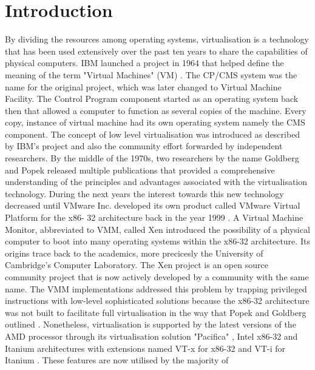 \section{Introduction}
By dividing the resources among operating systems,
virtualisation is a technology that has been used
extensively over the past ten years to share the
capabilities of physical computers. IBM launched a
project in 1964 that helped define the meaning of the term
"Virtual Machines" (VM) \cite{citation_1}. The CP/CMS system was
the name for the original project, which was later changed
to Virtual Machine Facility. The Control Program
component started as an operating system back then that
allowed a computer to function as several copies of the
machine. Every copy, instance of virtual machine had its
own operating system namely the CMS component. The
concept of low level virtualisation was introduced as
described by IBM’s project and also the community effort
forwarded by independent researchers. By the middle of
the 1970s, two researchers by the name Goldberg and
Popek released multiple publications \cite{citation_2}\cite{citation_3} that provided
a comprehensive understanding of the principles and
advantages associated with the virtualisation technology.
During the next years the interest towards this new
technology decreased until VMware Inc. developed its
own product called VMware Virtual Platform for the x86-
32 architecture back in the year 1999 \cite{citation_4}. \newline \newline
A Virtual Machine Monitor, abbreviated to VMM, called
Xen \cite{citation_5} introduced the possibility of a physical computer
to boot into many operating systems within the x86-32
architecture. Its origins trace back to the academics, more
precicesly the University of Cambridge’s Computer
Laboratory. The Xen project is an open source
community project that is now actively developed by a
community with the same name. \newline \newline
The VMM implementations addressed this problem by
trapping privileged instructions with low-level
sophisticated solutions because the x86-32 architecture
was not built to facilitate full virtualisation in the way that
Popek and Goldberg outlined \cite{citation_3}. Nonetheless,
virtualisation is supported by the latest versions of the
AMD processor through its virtualisation solution
"Pacifica" \cite{citation_7}, Intel x86-32 and Itanium architectures with
extensions named VT-x for x86-32 and VT-i for Itanium
\cite{citation_6}. These features are now utilised by the majority of
